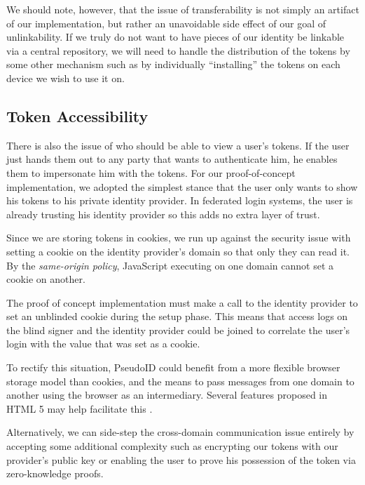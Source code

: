 \documentclass[11pt]{llncs}
\begin{document}
We should note, however, that the issue of
transferability is not simply an artifact of our implementation, but
rather an unavoidable side effect of our goal of unlinkability. If we
truly do not want to have pieces of our identity be linkable via
a central repository, we will need to handle the distribution of
the tokens by some other mechanism such as by individually ``installing''
the tokens on each device we wish to use it on.

\subsection{Token Accessibility}

There is also the issue of who should be able to view a user's tokens. If
the user just hands them out to any party that wants to authenticate him,
he enables them to impersonate him with the tokens. For our
proof-of-concept implementation, we adopted the simplest stance that
the user only wants to show his tokens to his private identity provider.
In federated login systems, the user is already trusting his identity provider
so this adds no extra layer of trust.


Since we are storing tokens in cookies, we run up against the security
issue with setting a cookie on the identity provider's domain so that
only they can read it. By the \emph{same-origin policy}, JavaScript
executing on one domain cannot set a
cookie on another. 

The proof of concept implementation must
make a call to the identity provider to set an unblinded cookie during
the setup phase. This means that access logs on the blind signer and
the identity provider could be joined to correlate the user's login
with the value that was set as a cookie.

To rectify this situation, PseudoID could benefit from a more flexible
browser storage model than
cookies, and the means to pass messages from one domain to another
using the browser as an intermediary. Several features proposed in
HTML 5 may help facilitate this \cite{HTML5}.

Alternatively, we can side-step the cross-domain communication
issue entirely by accepting some additional complexity such
as encrypting our tokens with our provider's public key or
enabling the user to prove
his possession of the token via zero-knowledge proofs.
\end{document}
